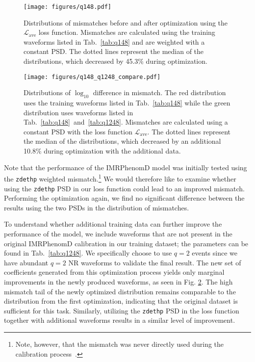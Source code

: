 \documentclass[twocolumn]{aastex631}
\newcommand{\zdethp}{\texttt{zdethp}}
\begin{document}
\begin{figure}[t]
	\centering
	\texttt{[image: figures/q148.pdf]}
	\caption{Distributions of mismatches before and after optimization using the 
	$\mathcal{L}_{\mathrm{ave}}$ loss function. Mismatches are calculated using the training waveforms listed in 
	Tab.~\ref{tab:q148} and	are weighted with a constant PSD. 
	The dotted lines represent the median of the distributions, which decreased by 45.3\% during optimization.}
	\label{fig:q148}
\end{figure}
\begin{figure}[t]
	\centering
	\texttt{[image: figures/q148\_q1248\_compare.pdf]}
	\caption{Distributions of $\log_{10}$ difference in mismatch. The red
	distribution uses the training waveforms listed in
	Tab.~\ref{tab:q148} while the green distribution uses waveforms
	listed in Tab.~\ref{tab:q148}~and~\ref{tab:q1248}. Mismatches are calculated
	using a constant PSD with the loss function $\mathcal{L}_{\mathrm{ave}}$. 
	The dotted lines represent the median of the distributions, which decreased by an additional 10.8\% during optimization with the additional data.}
	\label{fig:q148_q1248_compare}
\end{figure}

Note that the performance of the IMRPhenomD model was initially tested using the
{\zdethp} weighted mismatch.\footnote{
	Note, however, that the mismatch was never directly used during the calibration process~\citep{khan2016frequency, khan2019phenomenological}.
} We would therefore like to examine whether using the {\zdethp} PSD in our loss function
could lead to an improved mismatch. Performing the optimization again, we find no significant difference
between the results using the two PSDs in the distribution of mismatches.

To understand whether additional training data can further improve the
performance of the model, we include waveforms that are not present in the
original IMRPhenomD calibration in our training dataset; the parameters
can be found in Tab.~\ref{tab:q1248}. We specifically choose to use $q=2$ events
since we have abundant $q=2$ NR waveforms to validate the final result. The new
set of coefficients generated from this optimization process yields only
marginal improvements in the newly produced waveforms, as seen in Fig.
\ref{fig:q148_q1248_compare}. The high mismatch tail of the newly optimized
distribution remains comparable to the distribution from the first optimization, indicating that
the original dataset is sufficient for this task. Similarly, utilizing the
{\zdethp} PSD in the loss function together with additional waveforms results in a
similar level of improvement.
\end{document}
